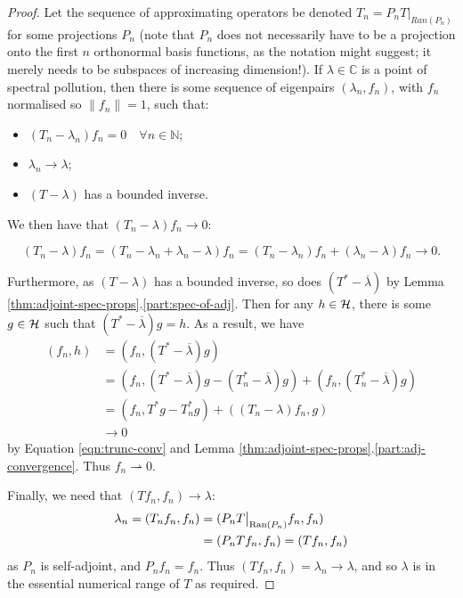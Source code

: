 \documentclass[../main.tex]{subfiles}
\begin{document}
\begin{proof}
Let the sequence of approximating operators be denoted $T_n = P_n
T\big|_{Ran(P_n)}$ for some projections $P_n$ (note that $P_n$ does not
necessarily have to be a projection onto the first $n$ orthonormal basis
functions, as the notation might suggest; it merely needs to be
subspaces of increasing dimension!). If $\lambda \in \mathbb{C}$ is a
point of spectral pollution, then there is some sequence of eigenpairs
$(\lambda_n, f_n)$, with $f_n$ normalised so $\|f_n\| = 1$, such that:
\begin{itemize}
  \item $(T_n - \lambda_n)f_n =0 \quad \forall n \in \mathbb{N}$;
  \item $\lambda_n \rightarrow \lambda$;
  \item $(T - \lambda)$ has a bounded inverse.
\end{itemize}
We then have that $(T_n - \lambda)f_n \rightarrow 0$:

\begin{equation}
\label{eqn:trunc-conv}
(T_n - \lambda)f_n = (T_n - \lambda_n + \lambda_n - \lambda)f_n 
		   = (T_n -\lambda_n)f_n + (\lambda_n - \lambda)f_n 
		   \rightarrow 0. 
\end{equation}

Furthermore, as $(T - \lambda)$ has a bounded inverse, so does $(T^* -
\overline{\lambda})$ by Lemma
\ref{thm:adjoint-spec-props}.\ref{part:spec-of-adj}. Then for any $h \in
\mathcal{H}$, there is some $g \in \mathcal{H}$ such that $(T^* - \overline{\lambda})g = h$.
As a result, we have
\begin{align*}
(f_n, h) & = (f_n, (T^* - \overline{\lambda})g) \\
& = (f_n, (T^* - \overline{\lambda})g - (T_n^* - \overline{\lambda})g) + (f_n, (T_n^* - \overline{\lambda})g) \\
& = (f_n, T^*g - T_n^*g) + ((T_n - \lambda)f_n, g) \\
& \rightarrow 0
\end{align*}
by Equation \ref{eqn:trunc-conv} and Lemma
\ref{thm:adjoint-spec-props}.\ref{part:adj-convergence}. Thus 
$f_n \rightharpoonup 0$.

Finally, we need that $(T f_n, f_n) \rightarrow \lambda$:
\begin{align*}
\lambda_n = (T_n f_n, f_n) & = (P_n T\big|_{\mathrm{Ran}(P_n)} f_n, f_n)  \\
& = (P_n T f_n, f_n) = (T f_n, f_n)
\end{align*}
as $P_n$ is self-adjoint, and $P_n f_n = f_n$. Thus $(T f_n, f_n) = \lambda_n
\rightarrow \lambda$, and so $\lambda$ is in the essential numerical range of $T$ as
required. \end{proof}
\end{document}

